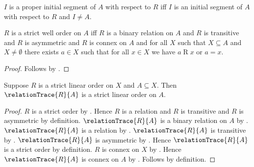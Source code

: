 \begin{definition}\label{proper_initial_segment}
    $I$ is a proper initial segment of $A$ with respect to $R$ iff
        $I$ is an initial segment of $A$ with respect to $R$ and $I\neq A$.
\end{definition}

\begin{proposition}\label{strict_well_order_iff}
    $R$ is a strict well order on $A$ iff
        $R$ is a binary relation on $A$ and
        $R$ is transitive and $R$ is asymmetric and $R$ is connex on $A$ and
        for all $X$ such that $X\subseteq A$ and $X\neq\emptyset$
            there exists $a\in X$ such that for all $x\in X$ we have
                $a\mathrel{R}x$ or $a=x$.
\end{proposition}
\begin{proof}
    Follows by
        .
\end{proof}

\begin{proposition}\label{relation_trace_strict_linear_order}
    Suppose $R$ is a strict linear order on $X$ and $A\subseteq X$.
    Then $\relationTrace{R}{A}$ is a strict linear order on $A$.
\end{proposition}
\begin{proof}
    $R$ is a strict order by .
    Hence $R$ is a relation and $R$ is transitive and
        $R$ is asymmetric by definition.
    $\relationTrace{R}{A}$ is a binary relation on $A$ by
        .
    $\relationTrace{R}{A}$ is a relation by
        .
    $\relationTrace{R}{A}$ is transitive by
        .
    $\relationTrace{R}{A}$ is asymmetric by
        .
    Hence $\relationTrace{R}{A}$ is a strict order by definition.
    $R$ is connex on $X$ by .
    Hence $\relationTrace{R}{A}$ is connex on $A$ by
        .
    Follows by definition.
\end{proof}

